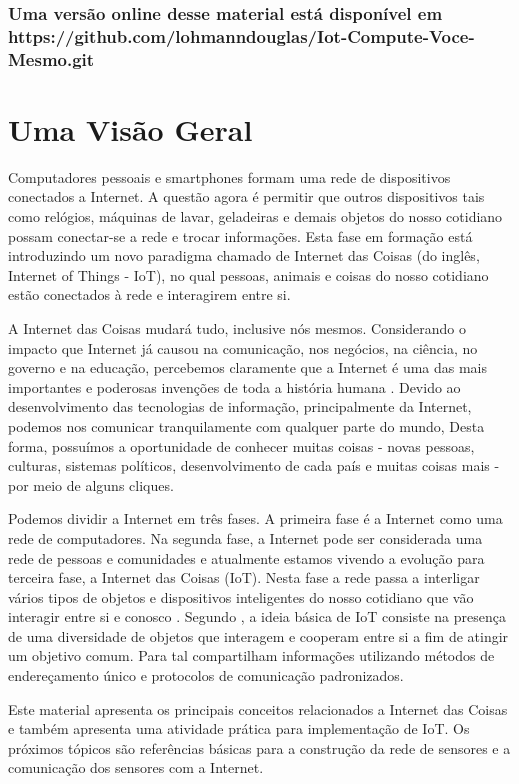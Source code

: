 \subsection*{\center \normalsize Uma versão online desse material está disponível em https://github.com/lohmanndouglas/Iot-Compute-Voce-Mesmo.git }


%

%
\tableofcontents
%
\mainmatter

\chapter{Uma Visão Geral}
Computadores pessoais e smartphones formam uma rede de dispositivos conectados a Internet. A questão agora é permitir  que outros dispositivos tais como relógios, máquinas de lavar, geladeiras e demais objetos do nosso cotidiano possam conectar-se a rede e trocar informações. Esta fase em formação está introduzindo um novo paradigma chamado de Internet das Coisas (do inglês, Internet of Things - IoT), no qual pessoas, animais e coisas do nosso cotidiano estão conectados à rede e interagirem entre si.


A Internet das Coisas mudará tudo, inclusive nós mesmos. Considerando o impacto que Internet já causou na comunicação, nos negócios, na ciência, no governo e na educação, percebemos claramente que a Internet é uma das mais importantes e poderosas invenções de toda a história humana \cite{daveevans2011}. Devido ao desenvolvimento das tecnologias de informação, principalmente da Internet, podemos nos comunicar tranquilamente com qualquer parte do mundo, Desta forma, possuímos a oportunidade de conhecer muitas coisas - novas pessoas, culturas, sistemas políticos, desenvolvimento de cada país e muitas coisas mais - por meio de alguns cliques. 


Podemos dividir a Internet em três fases. A primeira fase é a Internet como uma rede de computadores. Na segunda fase, a Internet pode ser considerada uma rede de pessoas e comunidades e atualmente estamos vivendo a evolução para terceira fase, a Internet das Coisas (IoT). Nesta fase a rede passa a interligar vários tipos de objetos e dispositivos inteligentes do nosso cotidiano que vão interagir entre si e conosco \cite{nicbr}.
Segundo \cite{atzori2010internet}, a ideia básica de IoT consiste na presença de uma diversidade de  objetos que interagem e cooperam entre si a fim de atingir um objetivo comum. Para tal compartilham informações utilizando métodos de endereçamento único e protocolos de comunicação padronizados. 

Este material apresenta os principais conceitos relacionados a Internet das Coisas e também apresenta uma atividade prática para implementação de IoT. Os próximos tópicos são referências básicas para a construção da rede de sensores e a comunicação dos sensores com a Internet. 
